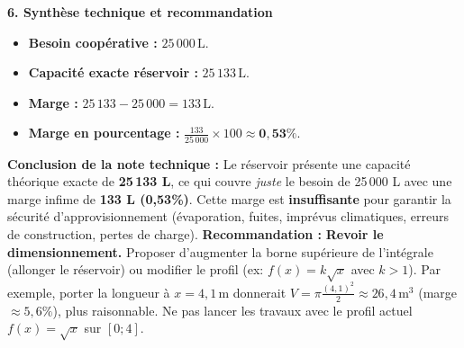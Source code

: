 \documentclass[11pt]{article}
\begin{document}
\begin{exoresolu}
\textbf{6. Synthèse technique et recommandation}\par
\begin{itemize}
    \item \textbf{Besoin coopérative :} $25\,000\,\text{L}$.
    \item \textbf{Capacité exacte réservoir :} $25\,133\,\text{L}$.
    \item \textbf{Marge :} $25\,133 - 25\,000 = 133\,\text{L}$.
    \item \textbf{Marge en pourcentage :} $\frac{133}{25\,000} \times 100 \approx \mathbf{0,53\%}$.
\end{itemize}
\textbf{Conclusion de la note technique :}
Le réservoir présente une capacité théorique exacte de \textbf{25\,133 L}, ce qui couvre \emph{juste} le besoin de 25\,000 L avec une marge infime de \textbf{133 L (0,53\%)}. Cette marge est \textbf{insuffisante} pour garantir la sécurité d'approvisionnement (évaporation, fuites, imprévus climatiques, erreurs de construction, pertes de charge).
\textbf{Recommandation :} \textbf{Revoir le dimensionnement.} Proposer d'augmenter la borne supérieure de l'intégrale (allonger le réservoir) ou modifier le profil (ex: $f(x)=k\sqrt{x}$ avec $k>1$). Par exemple, porter la longueur à $x=4,1\,\text{m}$ donnerait $V = \pi \frac{(4,1)^2}{2} \approx 26,4\,\text{m}^3$ (marge $\approx 5,6\%$), plus raisonnable. Ne pas lancer les travaux avec le profil actuel $f(x)=\sqrt{x}$ sur $[0;4]$.
\end{exoresolu}
\end{document}
